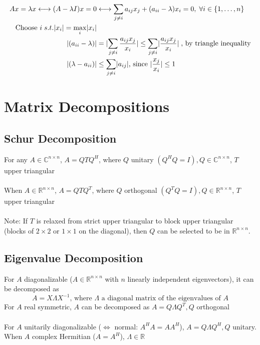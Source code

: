 \documentclass{article}
\begin{document}
\begin{align*}
    Ax = \lambda x \longleftrightarrow (A - \lambda I)x = 0 &\longleftrightarrow \sum_{j \neq i} a_{ij}x_j + (a_{ii} - \lambda)x_i = 0, \; \forall \space i \in \{1, \dots, n\}\\
    \textrm{Choose } i \; s.t. \lvert x_i\rvert  = \max_{i} \lvert x_i \rvert  \\
    \lvert (a_{ii} - \lambda) \rvert &= \lvert \sum_{j \neq i} \frac{a_{ij}x_j}{x_i}\rvert
    \leq \sum_{j \neq i} \lvert \frac{a_{ij}x_j}{x_i}\rvert \; \textrm{, by triangle inequality}\\
    \lvert (\lambda - a_{ii}) \rvert &\leq \sum_{j \neq i} \lvert a_{ij}\rvert 
    \textrm{, since $\lvert \frac{x_j}{x_i} \rvert \leq 1$}
\end{align*}

\section{Matrix Decompositions}
\subsection{Schur Decomposition}
For any $A \in \mathbb{C}^{n \times n}$, $A = QTQ^H$, where $Q$ unitary $(Q^HQ = I), Q \in \mathbb{C}^{n \times n}$, $T$ upper triangular\\ \\
When $A \in \mathbb{R}^{n \times n}$, $A = QTQ^T$, where $Q$ orthogonal $(Q^TQ = I), Q \in \mathbb{R}^{n \times n}$, $T$ upper triangular\\ \\
Note: If $T$ is relaxed from strict upper triangular to block upper triangular (blocks of $2\times 2$ or $1 \times 1$ on the diagonal), then $Q$ can be selected to be in $\mathbb{R}^{n\times n}$.


\subsection{Eigenvalue Decomposition}
For $A$ diagonalizable ($A\in \mathbb{R}^{n\times n}$ with $n$ linearly independent eigenvectors), it can be decomposed as
\begin{equation*}
    A = X \Lambda X^{-1} \textrm{, where $\Lambda$ a diagonal matrix of the eigenvalues of $A$}
\end{equation*}
For $A$ real symmetric, $A$ can be decomposed as $A = Q\Lambda Q^T, Q$ orthogonal\\ \\
For $A$ unitarily diagonalizable ($\Leftrightarrow$ normal: $A^HA = AA^H$), $A= Q\Lambda Q^H, Q$ unitary. When $A$ complex Hermitian ($A = A^H$), $\Lambda \in \mathbb{R}$
\end{document}
